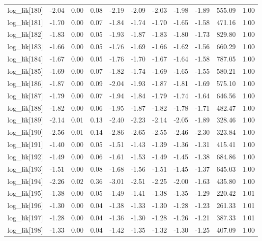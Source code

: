 \begin{table}[ht]
\begin{tabular}{rrrrrrrrrrr}
  log\_lik[180] & -2.04 & 0.00 & 0.08 & -2.19 & -2.09 & -2.03 & -1.98 & -1.89 & 555.09 & 1.00 \\ 
  log\_lik[181] & -1.70 & 0.00 & 0.07 & -1.84 & -1.74 & -1.70 & -1.65 & -1.58 & 471.16 & 1.00 \\ 
  log\_lik[182] & -1.83 & 0.00 & 0.05 & -1.93 & -1.87 & -1.83 & -1.80 & -1.73 & 829.80 & 1.00 \\ 
  log\_lik[183] & -1.66 & 0.00 & 0.05 & -1.76 & -1.69 & -1.66 & -1.62 & -1.56 & 660.29 & 1.00 \\ 
  log\_lik[184] & -1.67 & 0.00 & 0.05 & -1.76 & -1.70 & -1.67 & -1.64 & -1.58 & 787.05 & 1.00 \\ 
  log\_lik[185] & -1.69 & 0.00 & 0.07 & -1.82 & -1.74 & -1.69 & -1.65 & -1.55 & 580.21 & 1.00 \\ 
  log\_lik[186] & -1.87 & 0.00 & 0.09 & -2.04 & -1.93 & -1.87 & -1.81 & -1.69 & 575.10 & 1.00 \\ 
  log\_lik[187] & -1.79 & 0.00 & 0.07 & -1.94 & -1.84 & -1.79 & -1.74 & -1.64 & 646.56 & 1.00 \\ 
  log\_lik[188] & -1.82 & 0.00 & 0.06 & -1.95 & -1.87 & -1.82 & -1.78 & -1.71 & 482.47 & 1.00 \\ 
  log\_lik[189] & -2.14 & 0.01 & 0.13 & -2.40 & -2.23 & -2.14 & -2.05 & -1.89 & 328.46 & 1.00 \\ 
  log\_lik[190] & -2.56 & 0.01 & 0.14 & -2.86 & -2.65 & -2.55 & -2.46 & -2.30 & 323.84 & 1.00 \\ 
  log\_lik[191] & -1.40 & 0.00 & 0.05 & -1.51 & -1.43 & -1.39 & -1.36 & -1.31 & 415.41 & 1.00 \\ 
  log\_lik[192] & -1.49 & 0.00 & 0.06 & -1.61 & -1.53 & -1.49 & -1.45 & -1.38 & 684.86 & 1.00 \\ 
  log\_lik[193] & -1.51 & 0.00 & 0.08 & -1.68 & -1.56 & -1.51 & -1.45 & -1.37 & 645.03 & 1.00 \\ 
  log\_lik[194] & -2.26 & 0.02 & 0.36 & -3.01 & -2.51 & -2.25 & -2.00 & -1.63 & 435.80 & 1.00 \\ 
  log\_lik[195] & -1.38 & 0.00 & 0.05 & -1.49 & -1.41 & -1.38 & -1.35 & -1.29 & 220.42 & 1.01 \\ 
  log\_lik[196] & -1.30 & 0.00 & 0.04 & -1.38 & -1.33 & -1.30 & -1.28 & -1.23 & 261.33 & 1.01 \\ 
  log\_lik[197] & -1.28 & 0.00 & 0.04 & -1.36 & -1.30 & -1.28 & -1.26 & -1.21 & 387.33 & 1.01 \\ 
  log\_lik[198] & -1.33 & 0.00 & 0.04 & -1.42 & -1.35 & -1.32 & -1.30 & -1.25 & 407.09 & 1.00 \\ 

\end{tabular}
\end{table}
